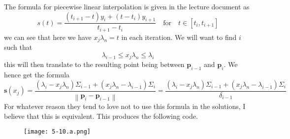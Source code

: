 \documentclass{article}
\begin{document}
\pagebreak 

\noindent The formula for piecewise linear interpolation is given in the lecture document as
\begin{equation*}
    s\left(t\right) = \frac{\left(t_{i+1}-t\right)y_{i} + \left(t-t_{i}\right)y_{i+1}}{t_{i+1} - t_{i}} \quad \text{for} \quad t\in \left[t_{i}, t_{i+1}\right]
\end{equation*}
we can see that here we have $x_{j}\lambda_{n} = t$ in each iteration. We will want to find $i$ such that 
\begin{equation*}
    \lambda_{i-1} \leq x_{j}\lambda_{n} \leq \lambda_{i}
\end{equation*}
this will then translate to the resulting point being between $\mathbf{p}_{i-1}$ and $\mathbf{p}_{i}$. We hence get the formula
\begin{equation*}
    \mathbf{s}\left(x_{j}\right) = \frac{\left(\lambda_{i} - x_{j}\lambda_{n}\right)\Sigma_{i-1}+ \left(x_{j}\lambda_{n} - \lambda_{i-1}\right)\Sigma_{i}}{\left\lVert \mathbf{p}_{i} - \mathbf{p}_{i-1}\right\rVert} = \frac{\left(\lambda_{i} - x_{j}\lambda_{n}\right)\Sigma_{i-1}+ \left(x_{j}\lambda_{n} - \lambda_{i-1}\right)\Sigma_{i}}{\delta_{i-1}}
\end{equation*}
For whatever reason they tend to love not to use this formula in the solutions, I believe that this is equivalent. This produces the following code.
\begin{figure}[!hbt]
    \centering
\texttt{[image: 5-10.a.png]}
\end{figure}

\pagebreak
\end{document}
